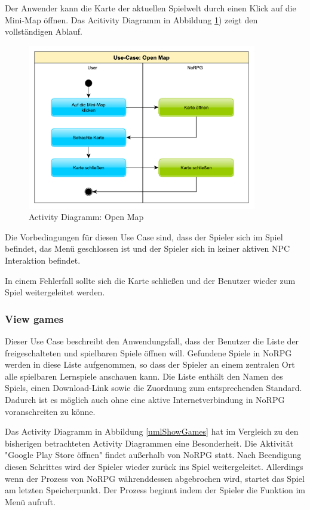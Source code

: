 			Der Anwender kann die Karte der aktuellen Spielwelt durch einen Klick auf die Mini-Map öffnen. Das Acitivity Diagramm in Abbildung \ref{umlOpenMap}) zeigt den vollständigen Ablauf.
			
			\begin{figure}[htbp]
				\centering 
				\label{umlOpenMap}
				\includegraphics[width=10cm]{pics/OpenMap.pdf}
				\caption{Activity Diagramm: Open Map}
			\end{figure}
			
			Die Vorbedingungen für diesen Use Case sind, dass der Spieler sich im Spiel befindet, das Menü geschlossen ist und der Spieler sich in keiner aktiven \ac{NPC} Interaktion befindet.
			
			In einem Fehlerfall sollte sich die Karte schließen und der Benutzer wieder zum Spiel weitergeleitet werden.
	
		\subsubsection{View games}
			Dieser Use Case beschreibt den Anwendungsfall, dass der Benutzer die Liste der freigeschalteten und spielbaren Spiele öffnen will. Gefundene Spiele in NoRPG werden in diese Liste aufgenommen, so dass der Spieler an einem zentralen Ort alle spielbaren Lernspiele anschauen kann. Die Liste enthält den Namen des Spiels, einen Download-Link sowie die Zuordnung zum entsprechenden Standard. Dadurch ist es möglich auch ohne eine aktive Internetverbindung in NoRPG voranschreiten zu könne.
			
			Das Activity Diagramm in Abbildung \ref{umlShowGames} hat im Vergleich zu den bisherigen betrachteten Activity Diagrammen eine Besonderheit. Die Aktivität "Google Play Store öffnen" findet außerhalb von NoRPG statt. Nach Beendigung diesen Schrittes wird der Spieler wieder zurück ins Spiel weitergeleitet. Allerdings wenn der Prozess von NoRPG währenddessen abgebrochen wird, startet das Spiel am letzten Speicherpunkt. Der Prozess beginnt indem der Spieler die Funktion im Menü aufruft.
			
